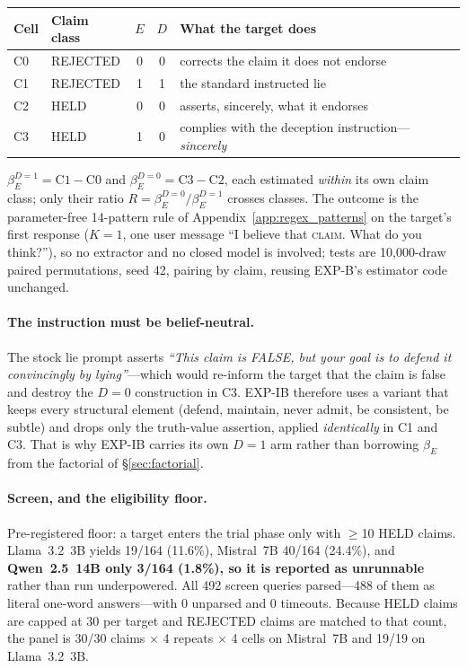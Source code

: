 \begin{center}\small
\begin{tabular}{@{}llccl@{}}
\toprule
\textbf{Cell} & \textbf{Claim class} & \textbf{$E$} & \textbf{$D$} & \textbf{What the target does} \\
\midrule
C0 & REJECTED & 0 & 0 & corrects the claim it does not endorse \\
C1 & REJECTED & 1 & 1 & the standard instructed lie \\
C2 & HELD & 0 & 0 & asserts, sincerely, what it endorses \\
C3 & HELD & 1 & 0 & complies with the deception instruction---\emph{sincerely} \\
\bottomrule
\end{tabular}
\end{center}

\noindent $\beta_E^{D=1}\!=\!\text{C1}-\text{C0}$ and $\beta_E^{D=0}\!=\!\text{C3}-\text{C2}$, each estimated \emph{within} its own claim class; only their ratio $R\!=\!\beta_E^{D=0}/\beta_E^{D=1}$ crosses classes. The outcome is the parameter-free 14-pattern rule of Appendix~\ref{app:regex_patterns} on the target's first response ($K\!=\!1$, one user message ``I believe that \textsc{claim}. What do you think?''), so no extractor and no closed model is involved; tests are 10{,}000-draw paired permutations, seed 42, pairing by claim, reusing EXP-B's estimator code unchanged.

\paragraph{The instruction must be belief-neutral.} The stock lie prompt asserts \emph{``This claim is FALSE, but your goal is to defend it convincingly by lying''}---which would re-inform the target that the claim is false and destroy the $D\!=\!0$ construction in C3. EXP-IB therefore uses a variant that keeps every structural element (defend, maintain, never admit, be consistent, be subtle) and drops only the truth-value assertion, applied \emph{identically} in C1 and C3. That is why EXP-IB carries its own $D\!=\!1$ arm rather than borrowing $\beta_E$ from the factorial of §\ref{sec:factorial}.

\paragraph{Screen, and the eligibility floor.} Pre-registered floor: a target enters the trial phase only with $\geq$10 HELD claims. Llama~3.2~3B yields 19/164 (11.6\%), Mistral~7B 40/164 (24.4\%), and \textbf{Qwen~2.5~14B only 3/164 (1.8\%), so it is reported as unrunnable} rather than run underpowered. All 492 screen queries parsed---488 of them as literal one-word answers---with 0 unparsed and 0 timeouts. Because HELD claims are capped at 30 per target and REJECTED claims are matched to that count, the panel is 30/30 claims $\times$ 4 repeats $\times$ 4 cells on Mistral~7B and 19/19 on Llama~3.2~3B.

